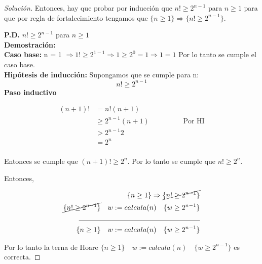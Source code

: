 \begin{proof}[Solución]
  Entonces, hay que probar por inducción que $n! \ge 2^{n - 1}$ para
  $n \ge 1$ para que por regla de fortalecimiento tengamos que $\{n
  \ge 1\} \Rightarrow \{n! \ge 2^{n - 1}\}$.

  \textbf{P.D.} $n! \ge 2^{n - 1}$ para $n \ge 1$\\
  \textbf{Demostración:}\\
  \textbf{Caso base:} n = 1
  $\Rightarrow 1! \ge 2^{1 - 1} \Rightarrow 1 \ge 2^0 = 1 \Rightarrow
  1 = 1$
  Por lo tanto se cumple el caso base.\\
  \textbf{Hipótesis de inducción:} Supongamos que se cumple para n:\\
  \begin{equation*}
    n! \ge 2^{n - 1}
  \end{equation*}
  \textbf{Paso inductivo}

  \begin{equation*}
    \begin{split}
      (n + 1)! &= n!(n + 1)\\
      & \ge 2^{n - 1}(n + 1) \hspace{2cm}\text{Por HI}\\
      & > 2^{n - 1}2\\
      & = 2^n\\
    \end{split}
  \end{equation*}

  Entonces se cumple que $(n + 1)! \ge 2^n$. Por lo tanto se cumple
  que $n! \ge 2^n$.

  Entonces,

    \begin{equation*}
      \begin{split}
        \{n \ge 1\} \Rightarrow \cancel{\{n! \ge 2^{n - 1}\}}\\
        \cancel{\{n! \ge 2^{n - 1}\}}\hspace{1em} w:= calcula(n) \hspace{1em} \{w \ge 2^{n - 1}\}\\
        \rule{6cm}{0.4pt}\\
        \{n \ge 1\}\hspace{1em} w:= calcula(n) \hspace{1em} \{w \ge 2^{n - 1}\}\\
    \end{split}
  \end{equation*}

  Por lo tanto la terna de Hoare $\{n \ge 1\}\hspace{1em} w:= calcula(n) \hspace{1em}
  \{w \ge 2^{n - 1}\}$ es correcta.

\end{proof}